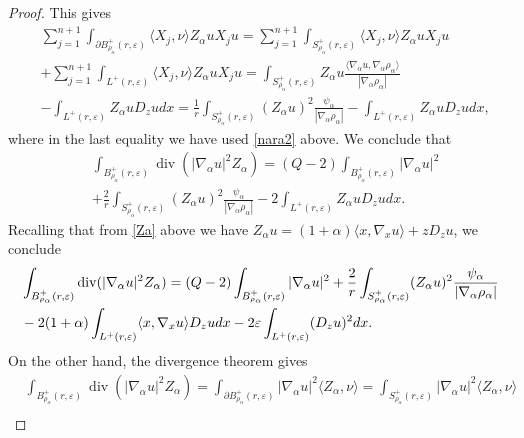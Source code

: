 \documentclass[11pt]{amsart}
\theoremstyle{plain}
\numberwithin{equation}{section}
\begin{document}
\begin{proof}
This gives
\begin{align*}
& \sum_{j=1}^{n+1} \int_{{\partial} B^+_{\rho_\alpha}(r,{\varepsilon})} \langle X_j,\nu\rangle Z_\alpha u X_j u = \sum_{j=1}^{n+1} \int_{S^+_{\rho_\alpha}(r,{\varepsilon})} \langle X_j,\nu\rangle Z_\alpha u X_j u
\\
& + \sum_{j=1}^{n+1} \int_{L^+(r,{\varepsilon})} \langle X_j,\nu\rangle Z_\alpha u X_j u =  \int_{S^+_{\rho_\alpha}(r,{\varepsilon})}  Z_\alpha u \frac{\langle{\nabla_\alpha} u,{\nabla_\alpha} \rho_\alpha\rangle}{|{\nabla_\alpha} \rho_\alpha|}
\\
&  - \int_{L^+(r,{\varepsilon})} Z_\alpha u D_z u dx = \frac 1r \int_{S^+_{\rho_\alpha}(r,{\varepsilon})}  (Z_\alpha u)^2 \frac{\psi_\alpha}{|{\nabla_\alpha} \rho_\alpha|}
- \int_{L^+(r,{\varepsilon})} Z_\alpha u D_z u dx,
\end{align*}
where in the last equality we have used \eqref{nara2} above. We conclude that
\begin{align*}
& \int_{B^+_{\rho_\alpha}(r,{\varepsilon})} \operatorname{div}(|{\nabla_\alpha} u|^2 Z_\alpha) =  (Q - 2) \int_{B^+_{\rho_\alpha}(r,{\varepsilon})} |{\nabla_\alpha} u|^2
\\
& + \frac 2r \int_{S^+_{\rho_\alpha}(r,{\varepsilon})}  (Z_\alpha u)^2 \frac{\psi_\alpha}{|{\nabla_\alpha} \rho_\alpha|}
- 2 \int_{L^+(r,{\varepsilon})} Z_\alpha u D_z u dx.
\end{align*}
Recalling that from \eqref{Za} above we have $Z_\alpha u = (1+\alpha) \langle x,\nabla_x u\rangle + z D_zu$, we conclude
\begin{align}\label{Dup}
& \int_{B^+_{\rho_\alpha}(r,{\varepsilon})} \operatorname{div}(|{\nabla_\alpha} u|^2 Z_\alpha) =  (Q - 2) \int_{B^+_{\rho_\alpha}(r,{\varepsilon})} |{\nabla_\alpha} u|^2 + \frac 2r \int_{S^+_{\rho_\alpha}(r,{\varepsilon})}  (Z_\alpha u)^2 \frac{\psi_\alpha}{|{\nabla_\alpha} \rho_\alpha|}
\\
&
- 2 (1+\alpha) \int_{L^+(r,{\varepsilon})}  \langle x,\nabla_x u\rangle  D_z u dx - 2 {\varepsilon} \int_{L^+(r,{\varepsilon})} (D_z u)^2 dx.
\notag
\end{align}
On the other hand, the divergence theorem gives
\begin{align*}
& \int_{B^+_{\rho_\alpha}(r,{\varepsilon})} \operatorname{div}(|{\nabla_\alpha} u|^2 Z_\alpha) = \int_{{\partial} B^+_{\rho_\alpha}(r,{\varepsilon})} |{\nabla_\alpha} u|^2 \langle Z_\alpha,\nu\rangle = \int_{S^+_{\rho_\alpha}(r,{\varepsilon})} |{\nabla_\alpha} u|^2 \langle Z_\alpha,\nu\rangle
\\

\end{align*}
\end{proof}
\end{document}
